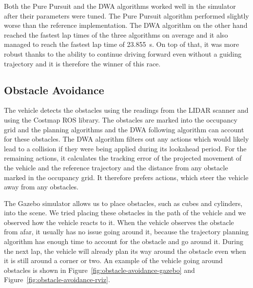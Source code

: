 Both the Pure Pursuit and the \gls*{DWA} algorithms worked well in the simulator after their parameters were tuned. The Pure Pursuit algorithm performed slightly worse than the reference implementation. The \gls*{DWA} algorithm on the other hand reached the fastest lap times of the three algorithms on average and it also managed to reach the fastest lap time of \SI{23.855}{\second}. On top of that, it was more robust thanks to the ability to continue driving forward even without a guiding trajectory and it is therefore the winner of this race.

\subsection{Obstacle Avoidance}

The vehicle detects the obstacles using the readings from the \gls*{LIDAR} scanner and using the Costmap ROS library. The obstacles are marked into the occupancy grid and the planning algorithms and the \gls*{DWA} following algorithm can account for these obstacles. The \gls*{DWA} algorithm filters out any actions which would likely lead to a collision if they were being applied during its lookahead period. For the remaining actions, it calculates the tracking error of the projected movement of the vehicle and the reference trajectory and the distance from any obstacle marked in the occupancy grid. It therefore prefers actions, which steer the vehicle away from any obstacles.

The Gazebo simulator allows us to place obstacles, such as cubes and cylinders, into the scene. We tried placing these obstacles in the path of the vehicle and we observed how the vehicle reacts to it. When the vehicle observes the obstacle from afar, it usually has no issue going around it, because the trajectory planning algorithm has enough time to account for the obstacle and go around it. During the next lap, the vehicle will already plan its way around the obstacle even when it is still around a corner or two. An example of the vehicle going around obstacles is shown in Figure~\ref{fig:obstacle-avoidance-gazebo} and Figure~\ref{fig:obstacle-avoidance-rviz}.

